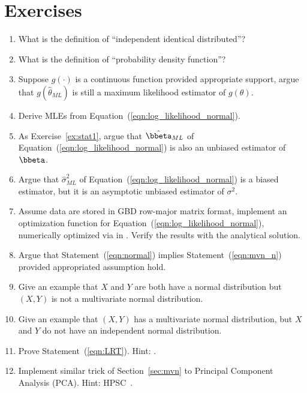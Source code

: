 \section{Exercises}
\label{sec:mle_exercise}

\begin{enumerate}[label=\thechapter-\arabic*]

\item
What is the definition of ``independent identical distributed''?

\item
What is the definition of ``probability density function''?

\item
Suppose $g(\cdot)$ is a continuous function provided appropriate support,
argue that $g\left(\hat{\theta}_{ML}\right)$ is still a maximum likelihood
estimator of $g(\theta)$.

\item
Derive MLEs from Equation~(\ref{eqn:log_likelihood_normal}).

\item
As Exercise~\ref{ex:stat1}, argue that $\hat{\bbeta}_{ML}$ of
Equation~(\ref{eqn:log_likelihood_normal}) is also
an unbiased estimator of $\bbeta$.

\item
Argue that $\hat{\sigma}^2_{ML}$ of
Equation~(\ref{eqn:log_likelihood_normal})
is a biased estimator, but it is an asymptotic
unbiased estimator of $\sigma^2$.

\item
Assume data are stored in GBD row-major matrix format,
implement an optimization function for
Equation~(\ref{eqn:log_likelihood_normal}), numerically optimized via
 in .
Verify the results with the analytical solution.
\label{ex:likelihood1}

\item
Argue that Statement~(\ref{eqn:normal}) implies Statement~(\ref{eqn:mvn_n})
provided appropriated assumption hold.

\item
Give an example that $X$ and $Y$ are both have a normal distribution
but $(X, Y)$ is not a multivariate normal distribution.

\item
Give an example that $(X, Y)$ has a multivariate normal distribution,
but $X$ and $Y$ do not have an independent normal distribution.

\item
Prove Statement~(\ref{eqn:LRT}).
{\color{blue} Hint: \citet{Ferguson1996}.}

\item
Implement similar trick of Section~\ref{sec:mvn} to Principal Component
Analysis (PCA).
{\color{blue} Hint: HPSC~\citep{hpsc2011}.}


\end{enumerate}

